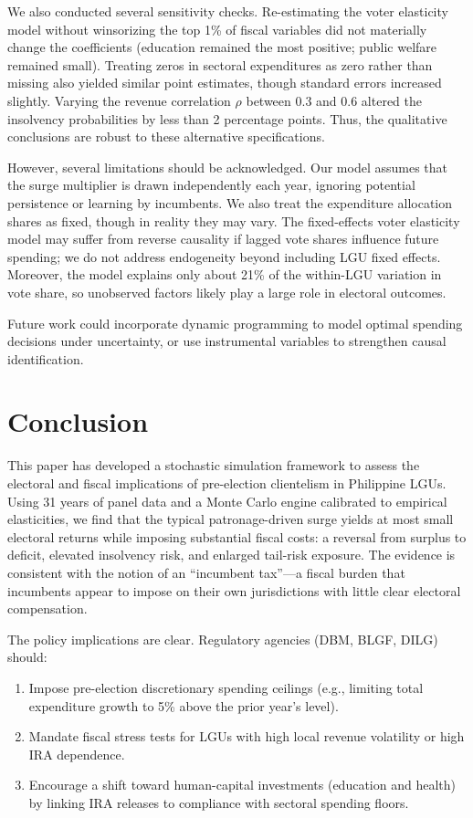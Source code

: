 \documentclass[twocolumn]{article}
\begin{document}
We also conducted several sensitivity checks. Re-estimating the voter elasticity model without winsorizing the top 1\% of fiscal variables did not materially change the coefficients (education remained the most positive; public welfare remained small). Treating zeros in sectoral expenditures as zero rather than missing also yielded similar point estimates, though standard errors increased slightly. Varying the revenue correlation $\rho$ between 0.3 and 0.6 altered the insolvency probabilities by less than 2 percentage points. Thus, the qualitative conclusions are robust to these alternative specifications.

However, several limitations should be acknowledged. Our model assumes that the surge multiplier is drawn independently each year, ignoring potential persistence or learning by incumbents. We also treat the expenditure allocation shares as fixed, though in reality they may vary. The fixed-effects voter elasticity model may suffer from reverse causality if lagged vote shares influence future spending; we do not address endogeneity beyond including LGU fixed effects. Moreover, the model explains only about 21\% of the within-LGU variation in vote share, so unobserved factors likely play a large role in electoral outcomes.

Future work could incorporate dynamic programming to model optimal spending decisions under uncertainty, or use instrumental variables to strengthen causal identification.

\section{Conclusion}

This paper has developed a stochastic simulation framework to assess the electoral and fiscal implications of pre-election clientelism in Philippine LGUs. Using 31 years of panel data and a Monte Carlo engine calibrated to empirical elasticities, we find that the typical patronage-driven surge yields at most small electoral returns while imposing substantial fiscal costs: a reversal from surplus to deficit, elevated insolvency risk, and enlarged tail-risk exposure. The evidence is consistent with the notion of an ``incumbent tax''—a fiscal burden that incumbents appear to impose on their own jurisdictions with little clear electoral compensation.

The policy implications are clear. Regulatory agencies (DBM, BLGF, DILG) should:

\begin{enumerate}
\item Impose pre-election discretionary spending ceilings (e.g., limiting total expenditure growth to 5\% above the prior year's level).
\item Mandate fiscal stress tests for LGUs with high local revenue volatility or high IRA dependence.
\item Encourage a shift toward human-capital investments (education and health) by linking IRA releases to compliance with sectoral spending floors.
\end{enumerate}
\end{document}
